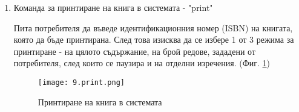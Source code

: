\begin{enumerate}
    \item Команда за принтиране на книга в системата - "print"
     
    Пита потребителя да въведе идентификационния номер (ISBN) на книгата, която да бъде принтирана. След това изисква да се избере 1 от 3 режима за принтиране - на цялото съдържание, на брой редове, зададени от потребителя, след които се паузира и на отделни изречения. (Фиг. \ref{fig:print})
    \begin{figure}[H]
        \texttt{[image: 9.print.png]}
        \centering
        \caption{Принтиране на книга в системата}
        \label{fig:print}
    \end{figure}
\end{enumerate}